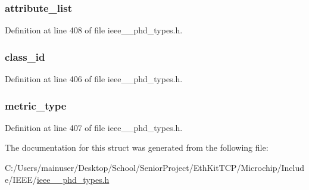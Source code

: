 \subsubsection[{attribute\+\_\+list}]{ attribute\+\_\+list}\label{struct___segm_elem_static_attr_entry_a55d9d2bb0279117dc42540f02b5f934c}


Definition at line 408 of file ieee\+\_\+\_\+phd\+\_\+types.\+h.

\hypertarget{struct___segm_elem_static_attr_entry_ad0a510237949ff545815366adea89f8b}{}
\subsubsection[{class\+\_\+id}]{ class\+\_\+id}\label{struct___segm_elem_static_attr_entry_ad0a510237949ff545815366adea89f8b}


Definition at line 406 of file ieee\+\_\+\_\+phd\+\_\+types.\+h.

\hypertarget{struct___segm_elem_static_attr_entry_a34ce56177f5504256755d9e1d12f4435}{}
\subsubsection[{metric\+\_\+type}]{ metric\+\_\+type}\label{struct___segm_elem_static_attr_entry_a34ce56177f5504256755d9e1d12f4435}


Definition at line 407 of file ieee\+\_\+\_\+phd\+\_\+types.\+h.



The documentation for this struct was generated from the following file\+:\begin{DoxyCompactItemize}
\item 
C\+:/\+Users/mainuser/\+Desktop/\+School/\+Senior\+Project/\+Eth\+Kit\+T\+C\+P/\+Microchip/\+Include/\+I\+E\+E\+E/\hyperlink{ieee__11073__phd__types_8h}{ieee\+\_\+\_\+phd\+\_\+types.\+h}\end{DoxyCompactItemize}
